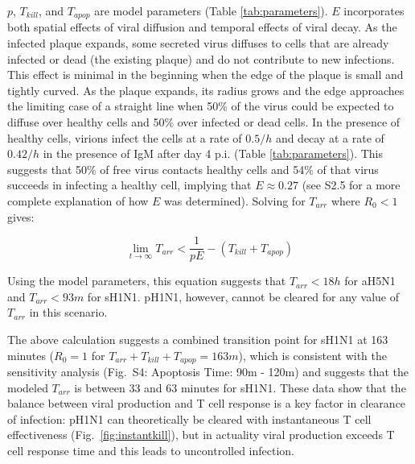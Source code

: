 \documentclass[preprint,10pt,authoryear]{elsarticle}
\begin{document}

$p$, $T_{kill}$, and $T_{apop}$ are model parameters (Table \ref{tab:parameters}).  $E$ incorporates both spatial effects of viral diffusion and temporal effects of viral decay.  As the infected plaque expands, some secreted virus diffuses to cells that are already infected or dead (the existing plaque) and do not contribute to new infections.  This effect is minimal in the beginning when the edge of the plaque is small and tightly curved.  As the plaque expands, its radius grows and the edge approaches the limiting case of a straight line when 50\% of the virus could be expected to diffuse over healthy cells and 50\% over infected or dead cells.  In the presence of healthy cells, virions infect the cells at a rate of $0.5/h$ and decay at a rate of $0.42/h$ in the presence of IgM after day 4 p.i.  (Table \ref{tab:parameters}).  This suggests that 50\% of free virus contacts healthy cells and 54\% of that virus succeeds in infecting a healthy cell, implying that $E \approx 0.27$ (see S2.5 for a more complete explanation of how $E$ was determined).  Solving for $T_{arr}$ where $R_0 < 1$ gives:

\begin{equation*}
\lim_{t \to \infty} T_{arr} < \frac{1}{pE} - (T_{kill} + T_{apop})
\tag{Eq. 4}
\end{equation*}

Using the model parameters, this equation suggests that $T_{arr} < 18h$ for aH5N1 and $T_{arr} < 93m$ for sH1N1.  pH1N1, however, cannot be cleared for any value of $T_{arr}$ in this scenario.  

The above calculation suggests a combined transition point for sH1N1 at 163 minutes ($R_0 = 1$ for $T_{arr}+T_{kill}+T_{apop}=163m$), which is consistent with the sensitivity analysis (Fig.~S4: Apoptosis Time: 90m - 120m) and suggests that the modeled $T_{arr}$ is between 33 and 63 minutes for sH1N1.  These data show that the balance between viral production and T cell response is a key factor in clearance of infection: pH1N1 can theoretically be cleared with instantaneous T cell effectiveness (Fig.~\ref{fig:instantkill}), but in actuality viral production exceeds T cell response time and this leads to uncontrolled infection.
\end{document}
